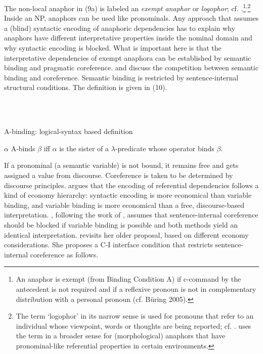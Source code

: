 \documentclass[output=paper]{langsci/langscibook}
\begin{document}
The non-local anaphor in (9a) is labeled an \textit{exempt anaphor} or \textit{logophor}; cf. \citet{Reuland2011}.\footnote{An anaphor is exempt (from Binding Condition A) if c-command by the antecedent is not required and if a reflexive pronoun is not in complementary distribution with a personal pronoun (cf. Büring 2005).}\textsuperscript{,}\footnote{The term ‘logophor’ in its narrow sense is used for pronouns that refer to an individual whose viewpoint, words or thoughts are being reported; cf. \citet{Speas2004}. \citet{Reuland2011} uses the term in a broader sense for (morphological) anaphors that have pronominal-like referential properties in certain environments.}  Inside an NP, anaphors can be used like pronominals. Any approach that assumes a (blind) syntactic encoding of anaphoric dependencies has to explain why anaphors have different interpretative properties inside the nominal domain and why syntactic encoding is blocked. What is important here is that the interpretative dependencies of exempt anaphora can be established by semantic binding and pragmatic coreference. \citet{Reinhart2006} and \citet{Reuland2011} discuss the competition between semantic binding and coreference. Semantic binding is restricted by sentence-internal structural conditions. The definition is given in (10). 

\ea%
    \label{ex:key:10}
    \gll\\
        \\
    \glt
    \z

          A-binding: logical-syntax based definition \citep[171]{Reinhart2006}

$\alpha $ A-binds $\beta $ iff $\alpha $ is the sister of a $\lambda $-predicate whose operator binds $\beta $.

If a pronominal (a semantic variable) is not bound, it remains free and gets assigned a value from discourse. Coreference is taken to be determined by discourse principles. \citet{Reuland2011} argues that the encoding of referential dependencies follows a kind of economy hierarchy: syntactic encoding is more economical than variable binding, and variable binding is more economical than a free, discourse-based interpretation. \citet{Reuland2011}, following the work of \citet{Reinhart1983}, assumes that sentence-internal coreference should be blocked if variable binding is possible and both methods yield an identical interpretation. \citet{Reinhart2006} revisits her older proposal, based on different economy considerations. She proposes a C-I interface condition that restricts sentence-internal coreference as follows.
\end{document}
